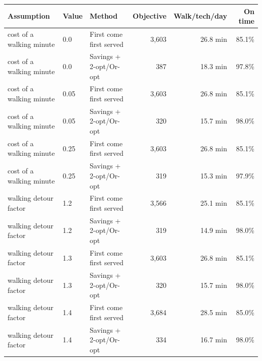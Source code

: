 \begin{tabular}{lllrrr}
\toprule
\textbf{Assumption} & \textbf{Value} & \textbf{Method} & \textbf{Objective} & \textbf{Walk/tech/day} & \textbf{On time} \\
\midrule
cost of a walking minute & 0.0 & First come first served & 3,603 & 26.8 min & 85.1\% \\
cost of a walking minute & 0.0 & Savings + 2-opt/Or-opt & 387 & 18.3 min & 97.8\% \\
cost of a walking minute & 0.05 & First come first served & 3,603 & 26.8 min & 85.1\% \\
cost of a walking minute & 0.05 & Savings + 2-opt/Or-opt & 320 & 15.7 min & 98.0\% \\
cost of a walking minute & 0.25 & First come first served & 3,603 & 26.8 min & 85.1\% \\
cost of a walking minute & 0.25 & Savings + 2-opt/Or-opt & 319 & 15.3 min & 97.9\% \\
walking detour factor & 1.2 & First come first served & 3,566 & 25.1 min & 85.1\% \\
walking detour factor & 1.2 & Savings + 2-opt/Or-opt & 319 & 14.9 min & 98.0\% \\
walking detour factor & 1.3 & First come first served & 3,603 & 26.8 min & 85.1\% \\
walking detour factor & 1.3 & Savings + 2-opt/Or-opt & 320 & 15.7 min & 98.0\% \\
walking detour factor & 1.4 & First come first served & 3,684 & 28.5 min & 85.0\% \\
walking detour factor & 1.4 & Savings + 2-opt/Or-opt & 334 & 16.7 min & 98.0\% \\
\bottomrule
\end{tabular}
